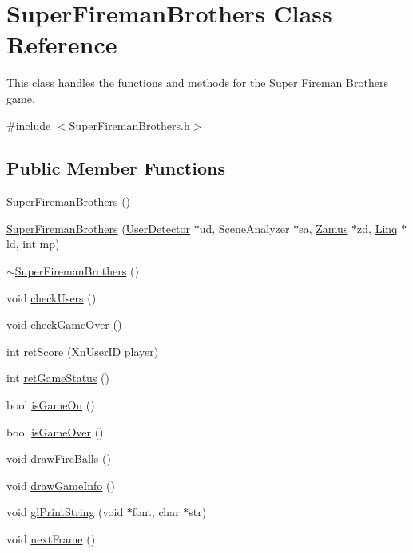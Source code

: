 \hypertarget{classSuperFiremanBrothers}{
\section{SuperFiremanBrothers Class Reference}
\label{classSuperFiremanBrothers}
}


This class handles the functions and methods for the Super Fireman Brothers game.  




{\ttfamily \#include $<$SuperFiremanBrothers.h$>$}

\subsection*{Public Member Functions}
\begin{DoxyCompactItemize}
\item 
\hyperlink{classSuperFiremanBrothers_abe477c6e372321590553ff470df34a54}{SuperFiremanBrothers} ()
\item 
\hyperlink{classSuperFiremanBrothers_a936a3dd9d6ee953f7f064f56affd85b3}{SuperFiremanBrothers} (\hyperlink{classUserDetector}{UserDetector} $\ast$ud, SceneAnalyzer $\ast$sa, \hyperlink{classZamus}{Zamus} $\ast$zd, \hyperlink{classLinq}{Linq} $\ast$ld, int mp)
\item 
\hyperlink{classSuperFiremanBrothers_a662a1f55259ebe79b80200e0dc0d25a8}{$\sim$SuperFiremanBrothers} ()
\item 
void \hyperlink{classSuperFiremanBrothers_a830c241d1985fa4504b5c4362764a1d1}{checkUsers} ()
\item 
void \hyperlink{classSuperFiremanBrothers_ab68b38d4b3287b8119d118e934d383db}{checkGameOver} ()
\item 
int \hyperlink{classSuperFiremanBrothers_afd61723532625d9895654ecdf1ab0d96}{retScore} (XnUserID player)
\item 
int \hyperlink{classSuperFiremanBrothers_a7a6d295519c8e1ba92be19f2745f040e}{retGameStatus} ()
\item 
bool \hyperlink{classSuperFiremanBrothers_a7e3951702064c2d473283e1eb8057b77}{isGameOn} ()
\item 
bool \hyperlink{classSuperFiremanBrothers_a2a4f3c77b730abb5a90e281601cf9440}{isGameOver} ()
\item 
void \hyperlink{classSuperFiremanBrothers_a2c47eaf4febde6a31420c7f12f855a4a}{drawFireBalls} ()
\item 
void \hyperlink{classSuperFiremanBrothers_a6376657264e9c488f276e66f25f9ce08}{drawGameInfo} ()
\item 
void \hyperlink{classSuperFiremanBrothers_a3438445a5d0cdc5863dd28edc4bbccbd}{glPrintString} (void $\ast$font, char $\ast$str)
\item 
void \hyperlink{classSuperFiremanBrothers_a9ef3423cc1e1b9cb563e4bbf933f5e56}{nextFrame} ()
\end{DoxyCompactItemize}


